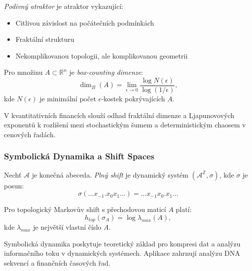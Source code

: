\begin{definition}
\emph{Podivný atraktor} je atraktor vykazující:
\begin{itemize}
\item Citlivou závislost na počátečních podmínkách
\item Fraktální strukturu
\item Nekomplikovanou topologii, ale komplikovanou geometrii
\end{itemize}
\end{definition}

\begin{definition}
Pro množinu $A \subset \mathbb{R}^n$ je \emph{box-counting dimenze}:
\[
\dim_B(A) = \lim_{\epsilon \to 0} \frac{\log N(\epsilon)}{\log(1/\epsilon)},
\]
kde $N(\epsilon)$ je minimální počet $\epsilon$-kostek pokrývajících $A$.
\end{definition}

\begin{application}
V kvantitativních financích slouží odhad fraktální dimenze a Ljapunovových exponentů k rozlišení mezi stochastickým šumem a deterministickým chaosem v cenových řadách.
\end{application}

\subsubsection{Symbolická Dynamika a Shift Spaces}

\begin{definition}
Nechť $\mathcal{A}$ je konečná abeceda. \emph{Plný shift} je dynamický systém $(\mathcal{A}^\mathbb{Z}, \sigma)$, kde $\sigma$ je posun:
\[
\sigma(\dots x_{-1}.x_0x_1\dots) = \dots x_{-1}x_0.x_1\dots
\]
\end{definition}

\begin{theorem}
Pro topologický Markovův shift s přechodovou maticí $A$ platí:
\[
h_{top}(\sigma_A) = \log \lambda_{max}(A),
\]
kde $\lambda_{max}$ je největší vlastní číslo $A$.
\end{theorem}

\begin{application}
Symbolická dynamika poskytuje teoretický základ pro kompresi dat a analýzu informačního toku v dynamických systémech. Aplikace zahrnují analýzu DNA sekvencí a finančních časových řad.
\end{application}


